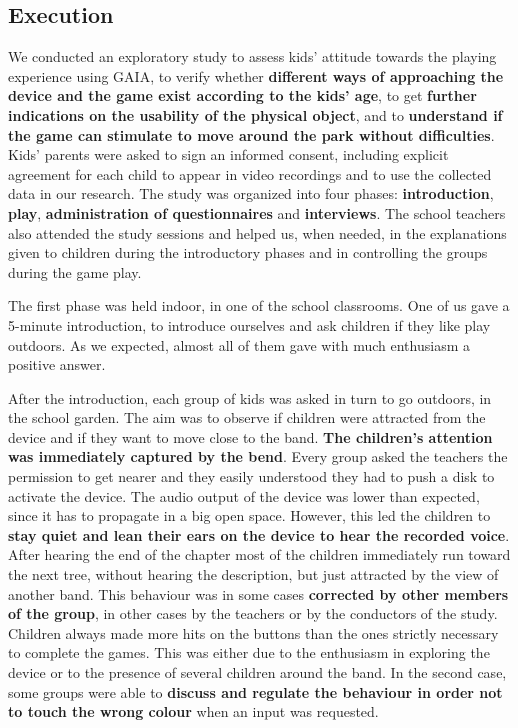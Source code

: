 \documentclass[a4paper,11pt]{report}
\begin{document}
\subsection{Execution}
We conducted an exploratory study to assess kids' attitude towards the playing experience using GAIA, to verify whether \textbf{different ways of approaching the device and the game exist according to the kids' age}, to get \textbf{further indications on the usability of the physical object}, and to \textbf{understand if the game can stimulate to move around the park without difficulties}. Kids' parents were asked to sign an informed consent, including explicit agreement for each child to appear in video recordings and to use the collected data in our research. The study was organized into four phases: \textbf{introduction}, \textbf{play}, \textbf{administration of questionnaires} and \textbf{interviews}. The school teachers also attended the study sessions and helped us, when needed, in the explanations given to children during the introductory phases and in controlling the groups during the game play.\par
The first phase was held indoor, in one of the school classrooms. One of us gave a 5-minute introduction, to introduce ourselves and ask children if they like play outdoors. As we expected, almost all of them gave with much enthusiasm a positive answer.\par 
After the introduction, each group of kids was asked in turn to go outdoors, in the school garden. The aim was to observe if children were attracted from the device and if they want to move close to the band. \textbf{The children's attention was immediately captured by the bend}. Every group asked the teachers the permission to get nearer and they easily understood they had to push a disk to activate the device. The audio output of the device was lower than expected, since it has to propagate in a big open space. However, this led the children to \textbf{stay quiet and lean their ears on the device to hear the recorded voice}. After hearing the end of the chapter most of the children immediately run toward the next tree, without hearing the description, but just attracted by the view of another band. This behaviour was in some cases \textbf{corrected by other members of the group}, in other cases by the teachers or by the conductors of the study. Children always made more hits on the buttons than the ones strictly necessary to complete the games. This was either due to the enthusiasm in exploring the device or to the presence of several children around the band. In the second case, some groups were able to \textbf{discuss and regulate the behaviour in order not to touch the wrong colour} when an input was requested.\par 
\end{document}
